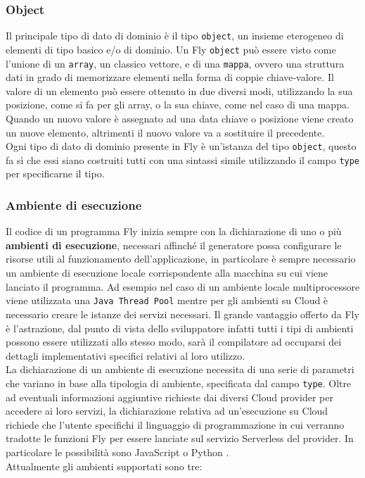 \subsubsection{Object} 
Il principale tipo di dato di dominio è il tipo \verb|object|, un insieme eterogeneo di elementi di tipo basico e/o di dominio. Un Fly \verb|object| può essere visto come l'unione di un \verb|array|, un classico vettore, e di una \verb|mappa|, ovvero una struttura dati in grado di memorizzare elementi nella forma di coppie chiave-valore. Il valore di un elemento può essere ottenuto in due diversi modi, utilizzando la sua posizione, come si fa per gli array, o la sua chiave, come nel caso di una mappa. Quando un nuovo valore è assegnato ad una data chiave o posizione viene creato un nuove elemento, altrimenti il nuovo valore va a sostituire il precedente. \\
Ogni tipo di dato di dominio presente in Fly è un'istanza del tipo \verb|object|, questo fa sì che essi siano costruiti tutti con una sintassi simile utilizzando il campo \verb|type| per specificarne il tipo.

\subsubsection{Ambiente di esecuzione}
Il codice di un programma Fly inizia sempre con la dichiarazione di uno o più \textbf{ambienti di esecuzione}, necessari affinché il generatore possa configurare le risorse utili al funzionamento dell'applicazione, in particolare è sempre necessario un ambiente di esecuzione locale corrispondente alla macchina su cui viene lanciato il programma. Ad esempio nel caso di un ambiente locale multiprocessore viene utilizzata una \verb|Java Thread Pool| mentre per gli ambienti su Cloud è necessario creare le istanze dei servizi necessari. Il grande vantaggio offerto da Fly è l'astrazione, dal punto di vista dello sviluppatore infatti tutti i tipi di ambienti possono essere utilizzati allo stesso modo, sarà il compilatore ad occuparsi dei dettagli implementativi specifici relativi al loro utilizzo. \\
La dichiarazione di un ambiente di esecuzione necessita di una serie di parametri che variano in base alla tipologia di ambiente, specificata dal campo \verb|type|. Oltre ad eventuali informazioni aggiuntive richieste dai diversi Cloud provider per accedere ai loro servizi, la dichiarazione relativa ad un'esecuzione su Cloud richiede che l'utente specifichi il linguaggio di programmazione in cui verranno tradotte le funzioni Fly per essere lanciate sul servizio Serverless del provider. In particolare le possibilità sono JavaScript \cite{JavaScriptSite} o Python \cite{PythonSite}.\\
Attualmente gli ambienti supportati sono tre:

